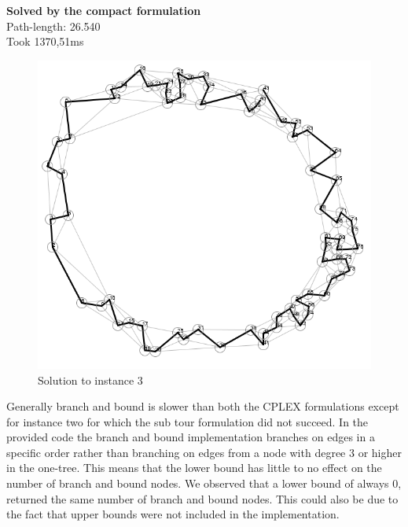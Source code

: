 \newpar \textbf{Solved by the compact formulation}\\
Path-length: 26.540\\
Took 1370,51ms

\begin{figure}[H]
	\includegraphics[width=.9\textwidth]{figures/Instance3Solution.png}
	\caption{Solution to instance 3}
	\label{solution:3}
\end{figure}

\newpar Generally branch and bound is slower than both the CPLEX formulations except for instance two for which the sub tour formulation did not succeed. In the provided code the branch and bound implementation branches on edges in a specific order rather than branching on edges from a node with degree 3 or higher in the one-tree. This means that the lower bound has little to no effect on the number of branch and bound nodes. We observed that a lower bound of always $0$, returned the same number of branch and bound nodes. This could also be due to the fact that upper bounds were not included in the implementation.